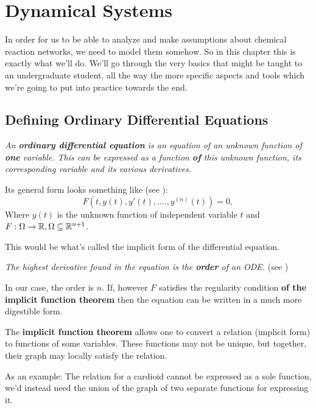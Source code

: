 \chapter{Dynamical Systems}
\label{chap:ch3}

In order for us to be able to analyze and make assumptions about chemical reaction networks, we need to model them somehow. So in this chapter this is exactly what we'll do. We'll go through the very basics that might be taught to an undergraduate student, all the way the more specific aspects and tools which we're going to put into practice towards the end.

\section{Defining Ordinary Differential Equations}
\begin{definition}
	\textit{An \textbf{ordinary differential equation} is an equation of an unknown function of \textbf{one} variable. This can be expressed as a function \textbf{of} this unknown function, its corresponding variable and its various derivatives}.
\end{definition}
Its general form looks something like (see \cite{hunter2011introduction}):
\begin{equation}\label{ODE}
	F(t,y(t),y'(t),....,y^{(n)}(t))=0,
\end{equation}
Where $y(t)$ is the unknown function of independent variable $t$ and $F : \Omega \rightarrow \mathbb{R},  \\ \Omega \subseteq \mathbb{R}^{n+1}$.

This would be what's called the implicit form of the differential equation.

\begin{definition}
	\textit{The highest derivative found in the equation is the \textbf{order} of an ODE.} (see \cite{binegar2008})
\end{definition}
In our case, the order is $n$.
If, however $F$ satisfies the regularity condition \textbf{of the implicit function theorem} then the equation can be written in a much more digestible form.

The \textbf{implicit function theorem} allows one to convert a relation (implicit form) to functions of some variables. These functions may not be unique, but together, their graph may locally satisfy the relation.

As an example: The relation for a cardioid cannot be expressed as a sole function, we'd instead need the union of the graph of two separate functions for expressing it.

